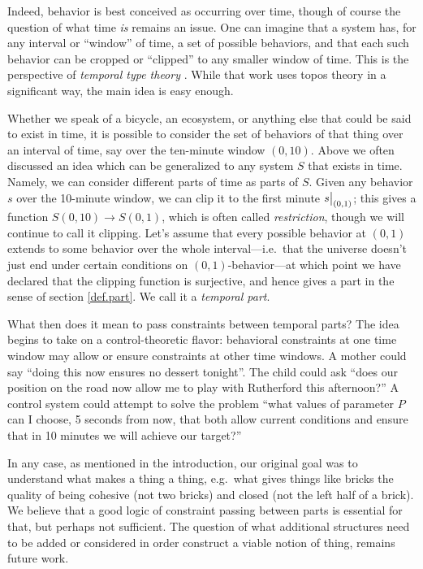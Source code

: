Indeed, behavior is best conceived as occurring over time, though of course the question of what time \emph{is} remains an issue. One can imagine that a system has, for any interval or ``window'' of time, a set of possible behaviors, and that each such behavior can be cropped or ``clipped'' to any smaller window of time. This is the perspective of \emph{temporal type theory} \cite{Schultz.Spivak:2017a}. While that work uses topos theory in a significant way, the main idea is easy enough.

Whether we speak of a bicycle, an ecosystem, or anything else that could be said to exist in time, it is possible to consider the set of behaviors of that thing over an interval of time, say over the ten-minute window $(0,10)$. Above we often discussed an idea which can be generalized to any system $S$ that exists in time. Namely, we can consider different parts of time as parts of $S$. Given any behavior $s$ over the 10-minute window, we can clip it to the first minute $s\big|_{(0,1)}$; this gives a function $S(0,10)\to S(0,1)$, which is often called \emph{restriction}, though we will continue to call it clipping. Let's assume that every possible behavior at $(0,1)$ extends to some behavior over the whole interval---i.e.\ that the universe doesn't just end under certain conditions on $(0,1)$-behavior---at which point we have declared that the clipping function is surjective, and hence gives a part in the sense of section \cref{def.part}. We call it a \emph{temporal part}.

What then does it mean to pass constraints between temporal parts? The idea
begins to take on a control-theoretic flavor: behavioral constraints at one time
window may allow or ensure constraints at other time windows. A mother could say
``doing this now ensures no dessert tonight''. The child could ask ``does our
position on the road now allow me to play with Rutherford this afternoon?'' A control system could attempt to solve the problem ``what values of parameter $P$ can I choose, 5 seconds from now, that both allow current conditions and ensure that in 10 minutes we will achieve our target?''

In any case, as mentioned in the introduction, our original goal was to understand what makes a thing a thing, e.g.\ what gives things like bricks the quality of being cohesive (not two bricks) and closed (not the left half of a brick). We believe that a good logic of constraint passing between parts is essential for that, but perhaps not sufficient. The question of what additional structures need to be added or considered in order construct a viable notion of thing, remains future work.
